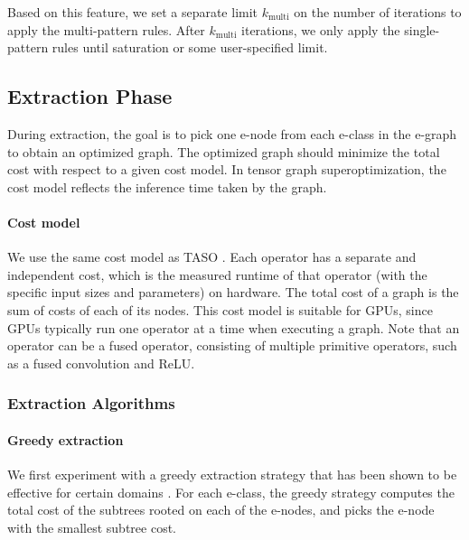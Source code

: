 Based on this feature, we set a separate limit $k_{\textrm{multi}}$ on the number of iterations to apply the multi-pattern rules.
After $k_{\textrm{multi}}$ iterations, we only apply the single-pattern rules until saturation or some user-specified limit.


\subsection{Extraction Phase}

During extraction, the goal is to pick one e-node from each e-class in the e-graph to obtain an optimized graph.
The optimized graph should minimize the total cost with respect to a given cost model.
In tensor graph superoptimization, the cost model reflects the inference time taken by the graph.

\paragraph{Cost model}
We use the same cost model as TASO \cite{taso}.
Each operator has a separate and independent cost, which is the measured runtime of that operator (with the specific input sizes and parameters) on hardware.
The total cost of a graph is the sum of costs of each of its nodes.
This cost model is suitable for GPUs, since GPUs typically run one operator at a time when executing a graph.
Note that an operator can be a fused operator, consisting of multiple primitive operators, such as a fused convolution and ReLU.

\subsubsection{Extraction Algorithms}
\label{sec:extraction}

\paragraph{Greedy extraction}

We first experiment with a greedy extraction strategy that has been shown to be effective for certain domains \cite{herbie, spores, egg}.
For each e-class, the greedy strategy computes the total cost of the subtrees rooted on each of the e-nodes, and picks the e-node with the smallest subtree cost.

